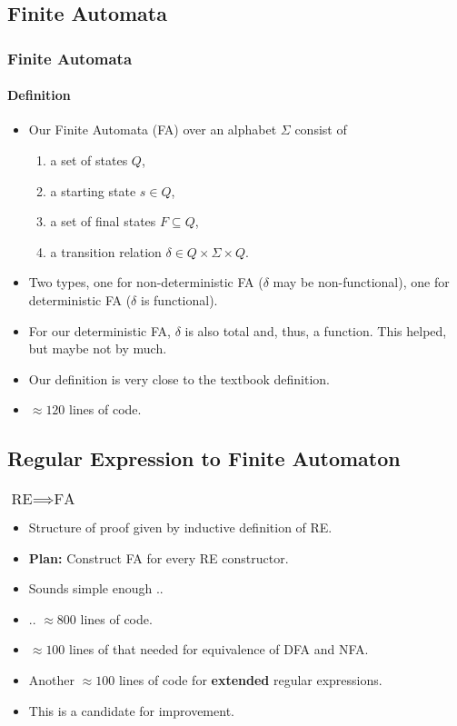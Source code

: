 \documentclass{beamer}
\begin{document}
\subsection{Finite Automata}
\begin{frame}
    \frametitle{Finite Automata}
    \framesubtitle{Definition}
    \begin{itemize}
        \item 
            Our Finite Automata (FA) over an alphabet $\Sigma$ consist of
            \begin{enumerate}
                \item a set of states $Q$,
                \item a starting state $s \in Q$,
                \item a set of final states $F \subseteq Q$,
                \item a transition relation $\delta \in Q \times \Sigma \times Q$.
            \end{enumerate}
        \item Two types, one for non-deterministic FA ($\delta$ may be non-functional), one for deterministic FA ($\delta$ is functional).
        \item For our deterministic FA, $\delta$ is also total and, thus, a function. This helped, but maybe not by much.
        \item Our definition is very close to the textbook definition.
        \item $\approx 120$ lines of code.
    \end{itemize}
\end{frame}

\subsection{Regular Expression to Finite Automaton}
\begin{frame}
    \frametitle{$\mbox{RE} \implies \mbox{FA}$}
    \begin{itemize}
        \item Structure of proof given by inductive definition of RE.
        \item \textbf{Plan:} Construct FA for every RE constructor.
        \item Sounds simple enough ..
        \item .. $\approx 800$ lines of code.
        \item $\approx 100$ lines of that needed for equivalence of DFA and NFA.
        \item Another $\approx 100$ lines of code for \textbf{extended} regular expressions.
        \item This is a candidate for improvement.
    \end{itemize}
\end{frame}
\end{document}
